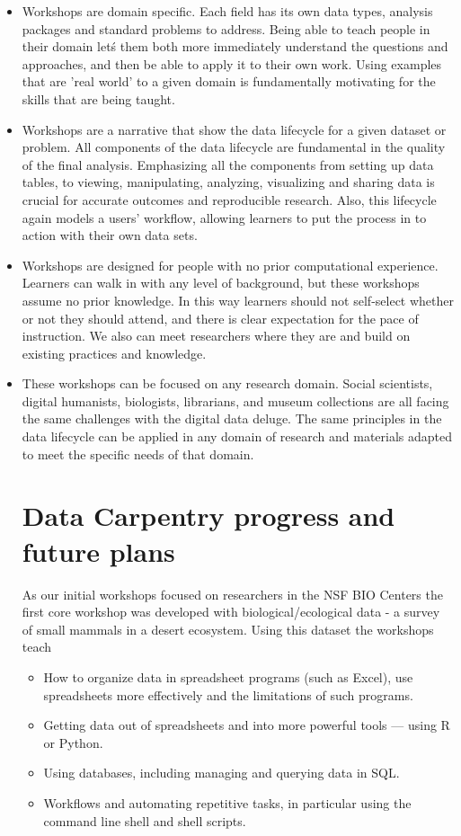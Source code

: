 \documentclass[15]{idcc}
\begin{document}
\begin{itemize}
\item Workshops are domain specific. Each field has its own data types, analysis packages and standard problems to address.
Being able to teach people in their domain let\'s them both more immediately understand the questions and approaches, and then
be able to apply it to their own work. Using examples that are 'real world' to a given domain is fundamentally motivating for
the skills that are being taught.

\item Workshops are a narrative that show the data lifecycle for a given dataset or problem. All components of the data lifecycle
are fundamental in the quality of the final analysis. Emphasizing all the components from setting up data tables, to viewing,
manipulating, analyzing, visualizing and sharing data is crucial for accurate outcomes and reproducible research. Also, this
lifecycle again models a users' workflow, allowing learners to put the process in to action with their own data sets.

\item Workshops are designed for people with no prior computational experience. Learners can walk in with any level of background,
but these workshops assume no prior knowledge. In this way learners should not self-select whether or not they should attend, and
there is clear expectation for the pace of instruction. We also can meet researchers where they are and build on existing practices
and knowledge.

\item These workshops can be focused on any research domain. Social scientists, digital humanists, biologists, librarians,
and museum collections are all facing the same challenges with the digital data deluge. The same principles in the data lifecycle
can be applied in any domain of research and materials adapted to meet the specific needs of that domain.

\section{Data Carpentry progress and future plans}

As our initial workshops focused on researchers in the NSF BIO Centers the first core workshop was developed with
biological/ecological data - a survey of small mammals in a desert ecosystem. Using this dataset the workshops teach
\begin{itemize}
\item How to organize data in spreadsheet programs (such as Excel), use spreadsheets more effectively and the limitations of such programs.
\item Getting data out of spreadsheets and into more powerful tools --- using R or Python.
\item Using databases, including managing and querying data in SQL.
\item Workflows and automating repetitive tasks, in particular using the command line shell and shell scripts.
\end{itemize}


\end{itemize}
\end{document}
